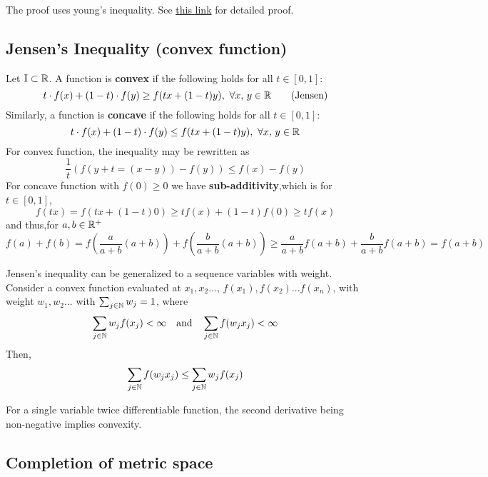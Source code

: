 \begin{remark}\rm\nextline
The proof uses young's inequality. See \href{https://en.wikipedia.org/wiki/Hölder's_inequality#Proof_of_Hölder's_inequality}{\color{blue}this link} for detailed proof.
\end{remark}

\subsection{Jensen's Inequality (convex function)}\label{Jensen's inquality}
Let $\mathbb{I}\subset \mathbb{R}$. A function  is {\bf convex} if the following holds for all $t\in[0,1]$:
$$
	t\cdot f(x)+(1-t)\cdot f(y)\geq f(tx+(1-t)y),\,\,\forall x,\,y\in \mathbb{R}\quad\quad\text{(Jensen)}
$$
Similarly,  a function  is {\bf concave} if the following holds for all $t\in[0,1]$:
$$
	t\cdot f(x)+(1-t)\cdot f(y)\leq f(tx+(1-t)y),\,\,\forall x,\,y\in \mathbb{R}
$$
For convex function, the inequality may be rewritten as
$$
	\frac{1}{t}(f(y+t
	=(x-y))-f(y))\leq f(x)-f(y)
$$
For concave function with $f(0)\geq 0$ we have {\bf sub-additivity},which is for $t\in[0,1]$,
$$
	f(tx)=f(tx+(1-t)0)\geq tf(x)+(1-t)f(0)\geq tf(x)
$$
and thus,for $a,b\in\mathbb{R}^+$
$$
	f(a)+f(b)=f(\frac{a}{a+b}(a+b))+f(\frac{b}{a+b}(a+b))\geq \frac{a}{a+b}f(a+b)+\frac{b}{a+b}f(a+b)=f(a+b)
$$

\begin{remark}\rm\nextline
	Jensen's inequality can be generalized to a sequence variables with weight. Consider a convex function evaluated at $x_1,x_2...$, $f(x_1),f(x_2)...f(x_n)$, with weight $w_1,w_2...$ with $\sum_{j\in\mathbb{N}}w_j=1$, where
	$$
		\sum_{j\in\mathbb{N}}w_j f(x_j)<\infty \quad\text{and}\quad
		\sum_{j\in\mathbb{N}} f(w_jx_j)<\infty
	$$
	Then,
	$$
		\sum_{j\in\mathbb{N}} f(w_jx_j)\leq\sum_{j\in\mathbb{N}}w_j f(x_j)
	$$
\end{remark}

\begin{remark}[$f''>0$]\rm\nextline
	For a single variable twice differentiable function, the second derivative being non-negative implies convexity.
\end{remark}


\subsection{Completion of metric space}\label{completion of metric space}


